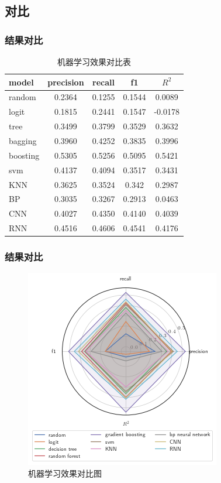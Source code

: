 \subsection{对比}
\begin{frame}
    \frametitle{结果对比}
    \centering
    \begin{table}
        \caption{机器学习效果对比表}
        \label{result}
        \begin{tabular}{l|cccc}
            model    & precision & recall & f1     & \(R^2\) \\\hline
            random   & 0.2364    & 0.1255 & 0.1544 & 0.0089  \\
            logit    & 0.1815    & 0.2441 & 0.1547 & -0.0178 \\
            tree     & 0.3499    & 0.3799 & 0.3529 & 0.3632  \\
            bagging  & 0.3960    & 0.4252 & 0.3835 & 0.3996  \\
            boosting & 0.5305    & 0.5256 & 0.5095 & 0.5421  \\
            svm      & 0.4137    & 0.4094 & 0.3517 & 0.3431  \\
            KNN      & 0.3625    & 0.3524 & 0.342  & 0.2987  \\
            BP       & 0.3035    & 0.3267 & 0.2913 & 0.0463  \\
            CNN      & 0.4027    & 0.4350 & 0.4140 & 0.4039  \\
            RNN      & 0.4516    & 0.4606 & 0.4541 & 0.4176  \\
        \end{tabular}
    \end{table}

\end{frame}
\begin{frame}
    \frametitle{结果对比}
    \centering
    \begin{figure}
        \includegraphics[width=0.5\linewidth]{../lib/output.png}
        \caption{机器学习效果对比图}
        \label{contrast}
    \end{figure}
\end{frame}
